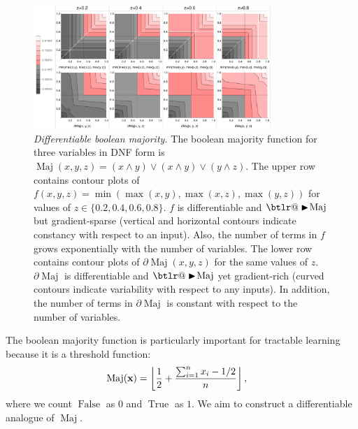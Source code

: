 \documentclass{article}
\makeatletter
\theoremstyle{plain}
\theoremstyle{definition}
\theoremstyle{remark}
\DeclareRobustCommand{\btright}{\mathrel{\mathpalette\btlr@\blacktriangleright}}
\newcommand{\btlr@}[2]{%
	\begingroup
	\sbox\z@{$\m@th#1\triangleright$}%
	\sbox\tw@{\resizebox{1.1\wd\z@}{1.1\ht\z@}{\raisebox{\depth}{$\m@th#1\mkern-1mu#2$}}}%
	\ht\tw@=\ht\z@ \dp\tw@=\dp\z@ \wd\tw@=\wd\z@
	\copy\tw@
	\endgroup
}
\makeatother
\begin{document}
\begin{figure}[t]
	\centering
	\includegraphics[trim=0pt 0pt 0pt 0pt, clip, width=0.8\textwidth]{../majority-gates.png}
	\caption{{\em Differentiable boolean majority.} The boolean majority function for three variables in DNF form is $\operatorname{Maj}(x,y,z) = (x \wedge y) \vee (x \wedge y) \vee (y \wedge z)$. The upper row contains contour plots of $f(x,y,z) = \operatorname{min}(\operatorname{max}(x,y), \operatorname{max}(x,z), \operatorname{max}(y,z))$ for values of $z \in \{0.2, 0.4, 0.6, 0.8\}$. $f$ is differentiable and $\btright\!\operatorname{Maj}$ but gradient-sparse (vertical and horizontal contours indicate constancy with respect to an input). Also, the number of terms in $f$ grows exponentially with the number of variables. The lower row contains contour plots of $\partial\!\operatorname{Maj}(x,y,z)$ for the same values of $z$. $\partial\!\operatorname{Maj}$ is differentiable and $\btright\!\operatorname{Maj}$ yet gradient-rich (curved contours indicate variability with respect to any inputs). In addition, the number of terms in $\partial\!\operatorname{Maj}$ is constant with respect to the number of variables.} 
	\label{fig:majority-plot}
\end{figure}

The boolean majority function is particularly important for tractable learning because it is a threshold function:
\begin{equation*}
\begin{aligned}
\operatorname{Maj}({\bf x}) &= \left\lfloor
\frac{1}{2} + \frac{\sum_{i=1}^{n} x_{i} - 1/2}{n}
\right\rfloor\text{,}
\end{aligned}
\end{equation*}
where we count $\operatorname{False}$ as $0$ and $\operatorname{True}$ as $1$. We aim to construct a differentiable analogue of $\operatorname{Maj}$.
\end{document}
